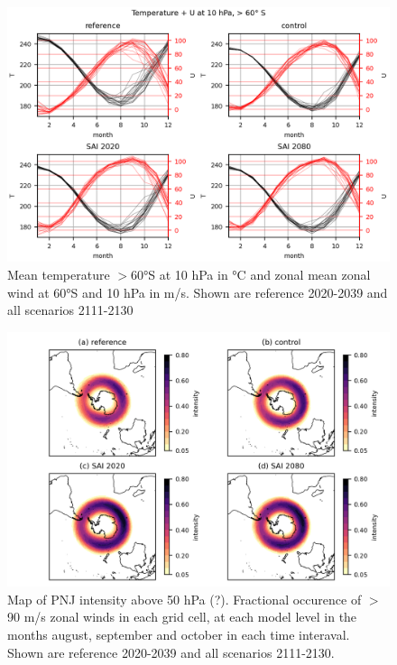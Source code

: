 \begin{figure}[H]
    \centering
    \includegraphics[width=\linewidth]{images/PNJ_climatogram.png}
    \caption{Mean temperature $>$60°S at 10 hPa in °C and zonal mean zonal wind at 60°S and 10 hPa in m/s. Shown are reference 2020-2039 and all scenarios 2111-2130}
    \label{fig:PNJ_climatogram}
\end{figure}

\begin{figure}[H]
    \centering
    \includegraphics[width=\linewidth]{images/PNJ_map.png}
    \caption{Map of PNJ intensity above 50 hPa (?). Fractional occurence of $>$90 m/s zonal winds in each grid cell, at each model level in the months august, september and october in each time interaval. Shown are reference 2020-2039 and all scenarios 2111-2130.}
    \label{fig:PNJ_map}
\end{figure}

